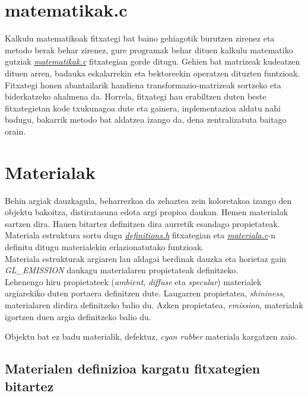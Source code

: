 \documentclass[12pt]{article}
\newcommand{\fitxategi}[1] {\underline{\textit{#1}}}
\newcommand{\aldagai}[1] {\textit{#1}}
\begin{document}
\section{matematikak.c}\label{matematikak}

Kalkulu matematikoak fitxategi bat baino gehiagotik burutzen zirenez eta metodo berak behar zirenez, gure programak behar dituen kalkulu matematiko gutziak \fitxategi{matematikak.c} fitxategian gorde ditugu. Gehien bat matrizeak kudeatzen dituen arren, badauka eskalarrekin eta bektoreekin operatzen dituzten funtzioak.\\

Fitxategi honen abantailarik handiena transformazio-matrizeak sortzeko eta biderkatzeko ahalmena da. Horrela, fitxategi hau erabiltzen duten beste fitxategietan kode txukunagoa dute eta gainera, inplementazioa aldatu nahi badugu, bakarrik metodo bat aldatzea izango da, dena zentralizatuta baitago orain.\\

\section{Materialak}

Behin argiak dauzkagula, beharrezkoa da zehaztea zein koloretakoa izango den objektu bakoitza, distiratasuna edota argi propioa daukan. Hemen materialak sartzen dira. Hauen bitartez definitzen dira aurretik esandago propietateak.\\

Materiala estruktura sortu dugu \fitxategi{definitions.h} fitxategian eta \fitxategi{materiala.c}-n definitu ditugu materialekin erlazionatutako funtzioak.\\

Materiala estrukturak argiaren lau aldagai berdinak dauzka eta horietaz gain \aldagai{GL\_EMISSION} daukagu materialaren propietateak definitzeko.\\

Lehenengo hiru propietateek (\aldagai{ambient}, \aldagai{diffuse} eta \aldagai{specular}) materialek argiarekiko duten portaera definitzen dute. Laugarren propietatea, \aldagai{shininess}, materialaren dirdira definitzeko balio du. Azken propietatea, \aldagai{emission}, materialak igortzen duen argia definitzeko balio du.

Objektu bat ez badu materialik, defektuz, \aldagai{cyan rubber} materiala kargatzen zaio.\\

\subsection{Materialen definizioa kargatu fitxategien bitartez}
\end{document}
